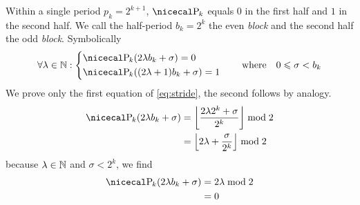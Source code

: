 \documentclass[a4paper,11pt, oneside]{report}
\newcommand{\concept}[1]{\emph{#1}}
\begin{document}
\lemma Within a single period $p_k = 2^{k+1}$, $\parity_k$ equals $0$ in the first half and $1$ in the second half. We call the half-period $b_k = 2^k$ the even \concept{block} and the second half the odd \concept{block}. Symbolically
\begin{equation}\label{eq:stride}
\forall \lambda \in \naturals: \left\{\begin{alignedat}{2}
&\parity_k(2\lambda b_k + \sigma) =  0  \\
&\parity_k((2 \lambda + 1) b_k + \sigma) = 1
\end{alignedat}\right. \qquad\text{where}\quad 0 \leqslant \sigma < b_k 
\end{equation}
 We prove only the first equation of \eqref{eq:stride}, the second follows by analogy.
\begin{equation*}
\begin{split}
\parity_k(2\lambda b_k + \sigma)
  &= \floor{{2\lambda 2^k + \sigma \over 2^k}} \bmod 2 \\
  &= \floor{2\lambda + {\sigma \over 2^k}} \bmod 2
\end{split}
\end{equation*}
because $\lambda \in \mathbb{N}$ and $\sigma < 2^k$, we find
\begin{equation*}
\begin{split}
\parity_k(2\lambda b_k + \sigma)
  &= 2\lambda \bmod 2 \\
  &= 0
\end{split}
\end{equation*}
\end{document}

